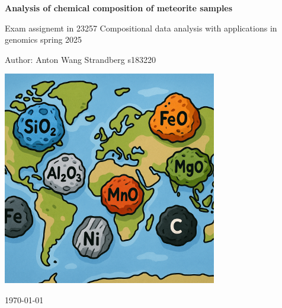 \documentclass{article}
\begin{document}
\begin{titlepage}
    \centering
    \vspace*{3cm}
    
    {\Huge \bfseries Analysis of chemical composition of meteorite samples \par}
    \vspace{1cm}
    
    {\large Exam assignemt in 23257 Compositional data analysis with applications in genomics spring 2025 \par}
    \vspace{1.5cm}
    
    
    {\Large Author: Anton Wang Strandberg s183220 \par}
    \vspace{2cm}
    
    \includegraphics[width=0.7\textwidth]{figures/frontpage.png} %
    \vfill
    
    {\large \today \par}
\end{titlepage}

\tableofcontents




\newpage





\newpage
















\end{document}
